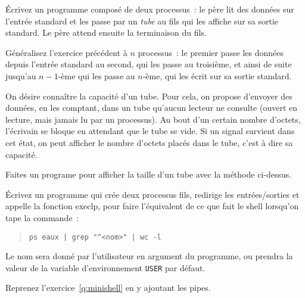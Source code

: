 %


% 


\question
    \label {q:tube1}

Écrivez un programme composé de deux processus~: le père lit des
données sur l'entrée standard et les passe par un {\em tube} au fils
qui les affiche sur sa sortie standard. Le père attend ensuite la
terminaison du fils.


\question

Généralisez l'exercice précédent à $n$ processus~:  le premier passe les
données depuis l'entrée standard au second, qui les passe au troisième,
et ainsi de suite jusqu'au $n-1$-ème qui les passe au $n$-ème, qui les
écrit sur sa sortie standard.


\question

On désire connaître la capacité d'un tube.  Pour cela, on propose
d'envoyer des données, en les comptant, dans un tube qu'aucun lecteur ne
consulte (ouvert en lecture, mais jamais lu par un processus).  Au bout
d'un certain nombre d'octets, l'écrivain se bloque en attendant que le
tube se vide.  Si un signal survient dans cet état, on peut afficher le
nombre d'octets placés dans le tube, c'est à dire sa capacité.

Faites un programe pour afficher la taille d'un tube avec la méthode
ci-dessus.


\question

Écrivez un programme qui crée deux processus fils, redirige les
entrées/sorties et appelle la fonction execlp, pour faire l'équivalent
de ce que fait le shell lorsqu'on tape la commande~:

\begin {quote}
    \texttt {ps eaux | grep "\^{ }<nom>" | wc -l}
\end {quote}

Le nom sera donné par l'utilisateur en argument du programme, ou
prendra la valeur de la variable d'environnement {\tt USER} par défaut.

\question

Reprenez l'exercice~\ref {q:minishell} en y ajoutant les pipes.

